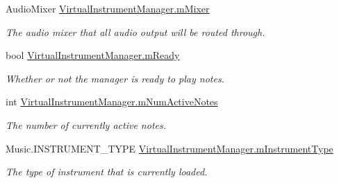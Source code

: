 \begin{DoxyCompactItemize}
\item 
\mbox{\label{group___virtual_instrument_manager_event_types_ga08c8db1bb89f4ab1e28451dd93d6b99c}} 
Audio\+Mixer \hyperlink{group___virtual_instrument_manager_event_types_ga08c8db1bb89f4ab1e28451dd93d6b99c}{Virtual\+Instrument\+Manager.\+m\+Mixer}
\begin{DoxyCompactList}\small\item\em The audio mixer that all audio output will be routed through. \end{DoxyCompactList}\item 
\mbox{\label{group___virtual_instrument_manager_event_types_ga983a11920bf16794735cc193c327ac42}} 
bool \hyperlink{group___virtual_instrument_manager_event_types_ga983a11920bf16794735cc193c327ac42}{Virtual\+Instrument\+Manager.\+m\+Ready}
\begin{DoxyCompactList}\small\item\em Whether or not the manager is ready to play notes. \end{DoxyCompactList}\item 
\mbox{\label{group___virtual_instrument_manager_event_types_ga0f7e11945763c48057be326b661dfdaf}} 
int \hyperlink{group___virtual_instrument_manager_event_types_ga0f7e11945763c48057be326b661dfdaf}{Virtual\+Instrument\+Manager.\+m\+Num\+Active\+Notes}
\begin{DoxyCompactList}\small\item\em The number of currently active notes. \end{DoxyCompactList}\item 
\mbox{\label{group___virtual_instrument_manager_event_types_ga108c350257b3a2080e06cd4a8251f6a4}} 
Music.\+I\+N\+S\+T\+R\+U\+M\+E\+N\+T\+\_\+\+T\+Y\+PE \hyperlink{group___virtual_instrument_manager_event_types_ga108c350257b3a2080e06cd4a8251f6a4}{Virtual\+Instrument\+Manager.\+m\+Instrument\+Type}
\begin{DoxyCompactList}\small\item\em The type of instrument that is currently loaded. \end{DoxyCompactList}\item 

\end{DoxyCompactItemize}
